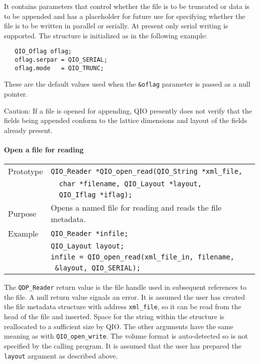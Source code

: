 \documentclass{article}
\newcommand{\QIOstring}{{\tt QIO\_String }}
\begin{document}
It contains parameters that control whether the file is to be
truncated or data is to be appended and has a placeholder for future
use for specifying whether the file is to be written in parallel or
serially.  At present only serial writing is supported.  The structure
is initialized as in the following example:

%
\begin{verbatim}
   QIO_Oflag oflag;
   oflag.serpar = QIO_SERIAL;
   oflag.mode   = QIO_TRUNC;
\end{verbatim}
%

These are the default values used when the \verb|&oflag| parameter is
passed as a null pointer.

Caution: If a file is opened for appending, QIO presently does not
verify that the fields being appended conform to the lattice
dimensions and layout of the fields already present.



\paragraph{Open a file for reading}

\begin{flushleft}
  \begin{tabular}{|l|l|}
  \hline
  Prototype      & \verb|QIO_Reader *QIO_open_read(|\QIOstring \verb|*xml_file,|\\
                 & \verb|  char *filename, QIO_Layout *layout, |\\
                 & \verb|  QIO_Iflag *iflag);|\\
  Purpose        & Opens a named file for reading and reads the file metadata. \\
\hline
  Example  & \verb|QIO_Reader *infile;| \\
           & \verb|QIO_Layout layout;| \\
           & \verb|infile = QIO_open_read(xml_file_in, filename,|\\
           & \verb| &layout, QIO_SERIAL);| \\
   \hline
 \end{tabular}
\end{flushleft}
%
The \verb|QDP_Reader| return value is the file handle used in
subsequent references to the file.  A null return value signals an
error.  It is assumed the user has created the file metadata structure
with address \verb|xml_file|, so it can be read from the head of the
file and inserted.  Space for the string within the structure is
reallocated to a sufficient size by QIO.  The other arguments have the
same meaning as with \verb|QIO_open_write|.  The volume format is
auto-detected so is not specified by the calling program.  It is
assumed that the user has prepared the \verb|layout| argument as
described above.
\end{document}
